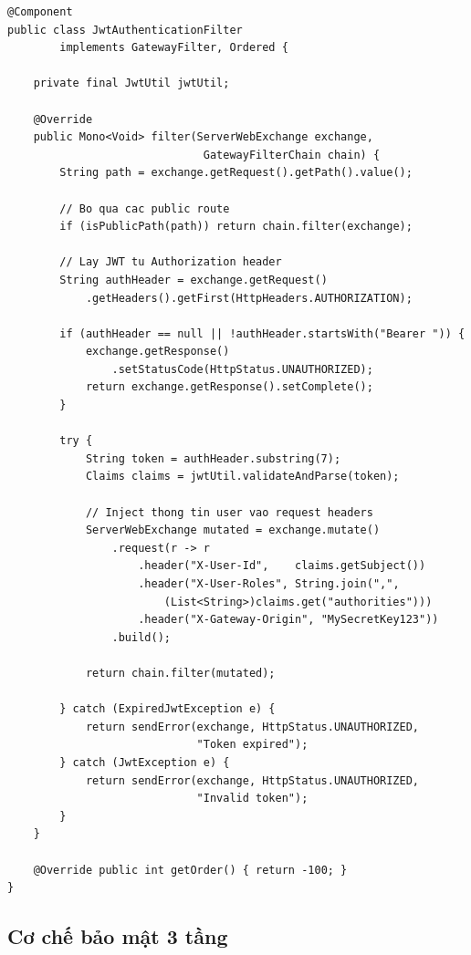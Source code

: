 \documentclass[12pt,a4paper]{report}
\begin{document}
\begin{lstlisting}[style=javaStyle, caption={JwtAuthenticationFilter --- xác thực JWT và inject headers}, label={lst:jwtfilter}]
@Component
public class JwtAuthenticationFilter
        implements GatewayFilter, Ordered {

    private final JwtUtil jwtUtil;

    @Override
    public Mono<Void> filter(ServerWebExchange exchange,
                              GatewayFilterChain chain) {
        String path = exchange.getRequest().getPath().value();

        // Bo qua cac public route
        if (isPublicPath(path)) return chain.filter(exchange);

        // Lay JWT tu Authorization header
        String authHeader = exchange.getRequest()
            .getHeaders().getFirst(HttpHeaders.AUTHORIZATION);

        if (authHeader == null || !authHeader.startsWith("Bearer ")) {
            exchange.getResponse()
                .setStatusCode(HttpStatus.UNAUTHORIZED);
            return exchange.getResponse().setComplete();
        }

        try {
            String token = authHeader.substring(7);
            Claims claims = jwtUtil.validateAndParse(token);

            // Inject thong tin user vao request headers
            ServerWebExchange mutated = exchange.mutate()
                .request(r -> r
                    .header("X-User-Id",    claims.getSubject())
                    .header("X-User-Roles", String.join(",",
                        (List<String>)claims.get("authorities")))
                    .header("X-Gateway-Origin", "MySecretKey123"))
                .build();

            return chain.filter(mutated);

        } catch (ExpiredJwtException e) {
            return sendError(exchange, HttpStatus.UNAUTHORIZED,
                             "Token expired");
        } catch (JwtException e) {
            return sendError(exchange, HttpStatus.UNAUTHORIZED,
                             "Invalid token");
        }
    }

    @Override public int getOrder() { return -100; }
}
\end{lstlisting}

\subsection{Cơ chế bảo mật 3 tầng}
\end{document}
